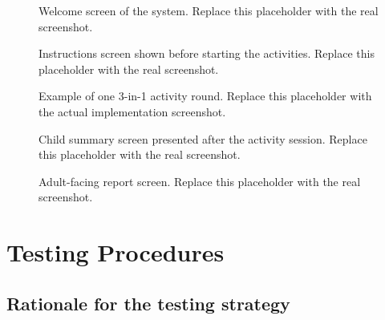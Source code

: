\documentclass[conference]{IEEEtran}
\begin{document}
\begin{figure}[htbp]
\centering
{}
\caption{Welcome screen of the system. Replace this placeholder with the real screenshot.}
\label{fig:welcome}
\end{figure}

\begin{figure}[htbp]
\centering
{}
\caption{Instructions screen shown before starting the activities. Replace this placeholder with the real screenshot.}
\label{fig:instructions}
\end{figure}

\begin{figure}[htbp]
\centering
{}
\caption{Example of one 3-in-1 activity round. Replace this placeholder with the actual implementation screenshot.}
\label{fig:round}
\end{figure}

\begin{figure}[htbp]
\centering
{}
\caption{Child summary screen presented after the activity session. Replace this placeholder with the real screenshot.}
\label{fig:child_summary}
\end{figure}

\begin{figure}[htbp]
\centering
{}
\caption{Adult-facing report screen. Replace this placeholder with the real screenshot.}
\label{fig:report}
\end{figure}

\section{Testing Procedures}

\subsection{Rationale for the testing strategy}
\end{document}
